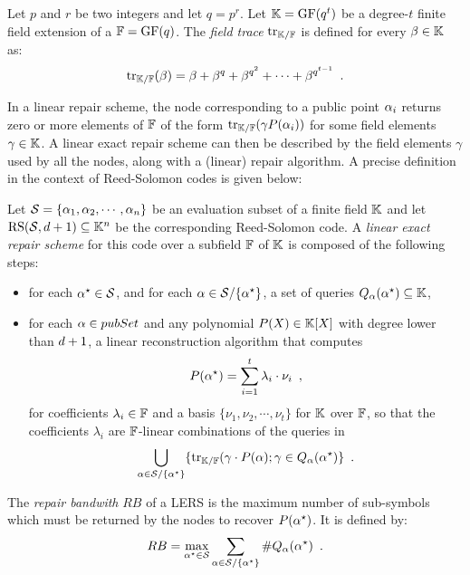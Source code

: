 \documentclass{llncs}
\begin{document}
\begin{definition}
Let $p$ and $r$ be two integers and let $q=p^r$. Let $\Field=\GF(q^t)$ be a degree-$t$ finite field extension of a $\FField=\GF(q)$. The {\em field trace} $\myTrace$ is defined for every $\beta \in \Field$ as:
\begin{equation}\label{equ:trace}
\myTrace(\beta) = \beta + \beta^q + \beta^{q^2} + \cdots + \beta^{q^{t-1}} \enspace .
\end{equation}
\end{definition}

In a linear repair scheme, the node corresponding to a public point $\pubElt$ returns zero or more elements of $\FField$ of the form $\myTrace(\gamma P(\pubElt))$ for some field elements $\gamma \in \Field$. A linear exact repair scheme can then be described by the field elements $\gamma$ used by all the nodes, along with a (linear) repair algorithm. A precise definition in the context of Reed-Solomon codes is given below:

\begin{definition}\label{def:LERS}
Let $\pubSet = \{\pubElt[1],\pubElt[2],\cdots,\pubElt[\nbShares]\}$ be an evaluation subset of a finite field $\Field$ and let $\RS[\pubSet, \order + 1]\subseteq \Field^{\nbShares}$ be the corresponding Reed-Solomon code. A {\em linear exact repair scheme} for this code over a subfield $\FField$ of $\Field$ is composed of the following steps:
\begin{itemize}
\item for each $\pubEltStar\in \pubSet$, and for each $\pubEltNoIndex\in \pubSet \slash \{\pubEltStar\}$, a set of queries $Q_{\pubEltNoIndex}(\pubEltStar)\subseteq \Field$,
\item for each $\pubEltNoIndex \in pubSet$ and any polynomial $P(X)\in \Field[X]$ with degree lower than $\order +1$, a linear reconstruction algorithm that computes 
$$
P(\pubEltStar) = \sum_{i=1}^t\lambda_i \cdot \nu_i \enspace ,
$$
for coefficients $\lambda_i\in \FField$ and a basis $\{\nu_1,\nu_2,\cdots,\nu_t\}$ for $\Field$ over $\FField$, so that the coefficients $\lambda_i$ are $\FField$-linear combinations of the queries in 
$$
\bigcup_{\pubEltNoIndex \in \pubSet \slash \{\pubEltStar\}}\{\myTrace(\gamma\cdot P(\pubEltNoIndex); \gamma \in Q_{\pubEltNoIndex}(\pubEltStar)\} \enspace .
$$
\end{itemize}
\end{definition}

The {\em repair bandwith} $RB$ of a LERS is the maximum number of sub-symbols which must be returned by the nodes to recover $P(\pubEltStar)$. It is defined by:
$$
RB = \max_{\pubEltStar \in \pubSet} \sum_{\pubEltNoIndex \in \pubSet \slash \{\pubEltStar\}} \# Q_{\pubEltNoIndex}(\pubEltStar) \enspace .
$$
\end{document}
